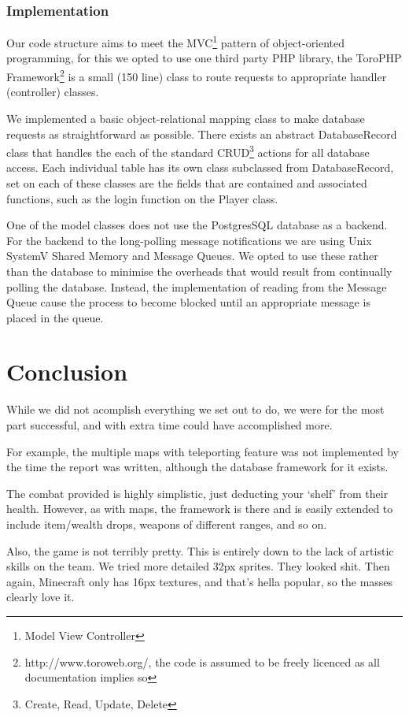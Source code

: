 \documentclass[12pt]{amsart}
\begin{document}
    \subsubsection{Implementation}
      \begin{flushleft}
        Our code structure aims to meet the MVC\footnote{Model View Controller} 
        pattern of object-oriented programming, for this we opted to use one third 
        party PHP library, the ToroPHP Framework\footnote{http://www.toroweb.org/, 
        the code is assumed to be freely licenced as all documentation implies so} 
        is a small (150 line) class to route requests to appropriate handler 
        (controller) classes.

        We implemented a basic object-relational mapping class to make database 
        requests as straightforward as possible. There exists an abstract 
        DatabaseRecord class that handles the each of the standard 
        CRUD\footnote{Create, Read, Update, Delete} actions for all database 
        access. Each individual table has its own class subclassed from 
        DatabaseRecord, set on each of these classes are the fields that are 
        contained and associated functions, such as the login function on the 
        Player class.

        One of the model classes does not use the PostgresSQL database as a 
        backend. For the backend to the long-polling message notifications we
        are using Unix SystemV Shared Memory and Message Queues. We opted to use 
        these rather than the database to minimise the overheads that would 
        result from continually polling the database. Instead, the 
        implementation of reading from the Message Queue cause the process to
        become blocked until an appropriate message is placed in the queue.
      \end{flushleft}

\section{Conclusion}
  \begin{flushleft}
    While we did not acomplish everything we set out to do, we were for the
    most part successful, and with extra time could have accomplished more. 

    For example, the multiple maps with teleporting feature was not implemented
    by the time the report was written, although the database framework for it
    exists. 

    The combat provided is highly simplistic, just deducting your `shelf' from
    their health. However, as with maps, the framework is there and is easily
    extended to include item/wealth drops, weapons of different ranges, and so
    on.

    Also, the game is not terribly pretty. This is entirely down to the lack of
    artistic skills on the team. We tried more detailed 32px sprites. They
    looked shit. Then again, Minecraft only has 16px textures, and that's hella
    popular, so the masses clearly love it.
  \end{flushleft}
\end{document}
